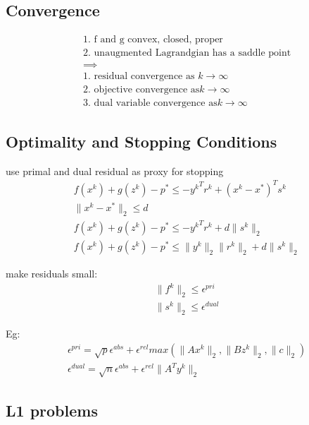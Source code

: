 \documentclass[8pt]{extarticle}
\newcommand{\norm}[1]{\|#1\|}
\begin{document}
\begin{multicols*}{2}
  \vfill\null
  \columnbreak
  
  \subsection{Convergence}
  \begin{align*}
    &\text{1. f and g convex, closed, proper}\\
    &\text{2. unaugmented Lagrandgian has a saddle point}\\
    &\implies\\
    &\text{1. residual convergence as }k \rightarrow \infty\\
    &\text{2. objective convergence as}k \rightarrow \infty\\
    &\text{3. dual variable convergence as}k \rightarrow \infty
  \end{align*}
  
\subsection{Optimality and Stopping Conditions}
  use primal and dual residual as proxy for stopping\\
  \begin{align*}
    &f(x^k)+g(z^k)-p^* \leq -{y^k}^T r^k + (x^k-x^*)^T s^k\\
    &\norm{x^k-x^*}_2 \leq d\\
    &f(x^k)+g(z^k)-p^* \leq -{y^k}^T r^k + d \norm{s^k}_2\\
    &f(x^k)+g(z^k)-p^* \leq \norm{y^k}_2 \norm{r^k}_2 + d \norm{s^k}_2
  \end{align*}

  make residuals small:
  \begin{align*}
    &\norm{f^k}_2 \leq \epsilon^{pri}\\
    &\norm{s^k}_2 \leq \epsilon^{dual}
  \end{align*}

  Eg:
  \begin{align*}
    &\epsilon^{pri}=\sqrt{p} \epsilon^{abs} + \epsilon^{rel} max(\norm{Ax^k}_2, \norm{Bz^k}_2, \norm{c}_2)\\
    &\epsilon^{dual}=\sqrt{n} \epsilon^{abs} + \epsilon^{rel} \norm{A^T y^k}_2
  \end{align*}
    
  \vfill\null
  \columnbreak

  \subsection{L1 problems}
  

\end{multicols*}
\end{document}
